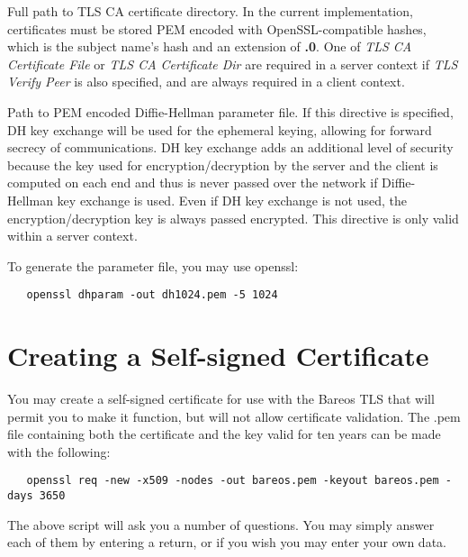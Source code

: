 \begin{description}
Full path to TLS CA certificate directory.  In the current implementation,
certificates must be stored PEM encoded with OpenSSL-compatible hashes,
which is the subject name's hash and an extension of {\bf .0}.
One of \emph{TLS CA Certificate File} or \emph{TLS CA Certificate Dir} are
required in a server context if \emph{TLS Verify Peer} is also specified,
and are always required in a client context.

Path to PEM encoded Diffie-Hellman parameter file.  If this directive is
specified, DH key exchange will be used for the ephemeral keying, allowing
for forward secrecy of communications.  DH key exchange adds an additional
level of security because the key used for encryption/decryption by the
server and the client is computed on each end and thus is never passed over
the network if Diffie-Hellman key exchange is used.  Even if DH key
exchange is not used, the encryption/decryption key is always passed
encrypted.  This directive is only valid within a server context.

To generate the parameter file, you
may use openssl:

\begin{verbatim}
   openssl dhparam -out dh1024.pem -5 1024
\end{verbatim}

\end{description}

\section{Creating a Self-signed Certificate}

You may create a self-signed certificate for use with the Bareos TLS that
will permit you to make it function, but will not allow certificate
validation.  The .pem file containing both the certificate and the key
valid for ten years can be made with the following:

\footnotesize
\begin{verbatim}
   openssl req -new -x509 -nodes -out bareos.pem -keyout bareos.pem -days 3650
\end{verbatim}
\normalsize

The above script will ask you a number of questions. You may simply answer
each of them by entering a return, or if you wish you may enter your own data.

